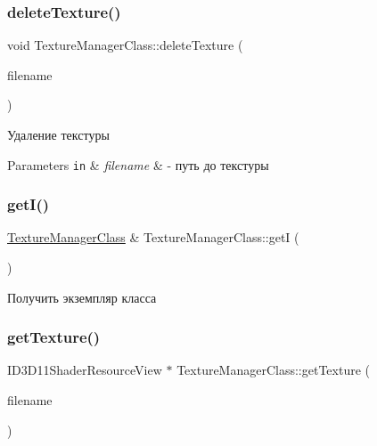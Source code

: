 \subsubsection{\texorpdfstring{delete\+Texture()}{deleteTexture()}}
{\footnotesize\ttfamily void Texture\+Manager\+Class\+::delete\+Texture (\begin{DoxyParamCaption}\item[{\hyperlink{class_path_class}{Path\+Class} $\ast$}]{filename }\end{DoxyParamCaption})}



Удаление текстуры 


\begin{DoxyParams}[1]{Parameters}
\mbox{\tt in}  & {\em filename} & -\/ путь до текстуры \\
\hline
\end{DoxyParams}
\mbox{\label{class_texture_manager_class_ab038ef11eeac2070d9dad46d01764b00}} 
\subsubsection{\texorpdfstring{get\+I()}{getI()}}
{\footnotesize\ttfamily \hyperlink{class_texture_manager_class}{Texture\+Manager\+Class} \& Texture\+Manager\+Class\+::getI (\begin{DoxyParamCaption}{ }\end{DoxyParamCaption})\hspace{0.3cm}{\ttfamily [static]}}



Получить экземпляр класса 

\mbox{\label{class_texture_manager_class_a902cc8c96b5fc09937854a36944b93f9}} 
\subsubsection{\texorpdfstring{get\+Texture()}{getTexture()}\hspace{0.1cm}{\footnotesize\ttfamily [1/2]}}
{\footnotesize\ttfamily I\+D3\+D11\+Shader\+Resource\+View $\ast$ Texture\+Manager\+Class\+::get\+Texture (\begin{DoxyParamCaption}\item[{\hyperlink{class_path_class}{Path\+Class} $\ast$}]{filename }\end{DoxyParamCaption})}



